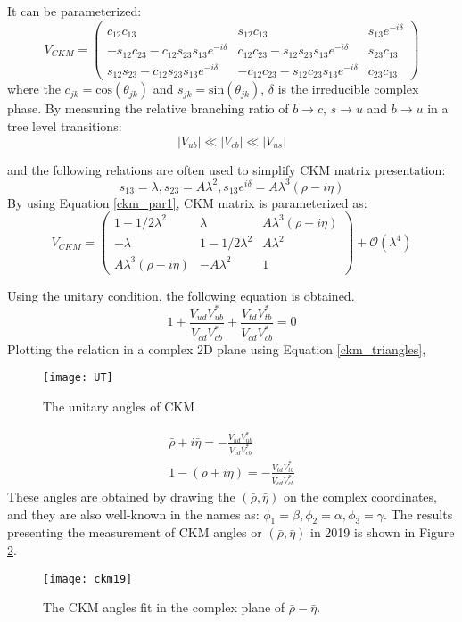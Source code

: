 It can be parameterized:
\begin{equation}
V_{CKM}=
\begin{pmatrix}
c_{12}c_{13} & s_{12}c_{13} & s_{13}e^{-i\delta }\\
-s_{12}c_{23}-c_{12}s_{23}s_{13}e^{-i\delta } &c_{12}c_{23}-s_{12}s_{23}s_{13}e^{-i\delta } & s_{23}c_{13}\\
s_{12}s_{23}-c_{12}s_{23}s_{13}e^{-i\delta }  & -c_{12}c_{23}-s_{12}c_{23}s_{13}e^{-i\delta } & c_{23}c_{13}
\end{pmatrix}
\end{equation}
where the $c_{jk}=\text{cos}(\theta_{jk})$ and $s_{jk}=\text{sin}(\theta_{jk})$, $\delta$ is the irreducible complex phase. By measuring the relative branching ratio of $b\to c$, $s\to u$ and $b\to u$ in a tree level transitions: 
\begin{equation}
|V_{ub}|\ll |V_{cb}|\ll |V_{us}|
\end{equation}

and the following relations are often used to simplify CKM matrix presentation:
\begin{equation}\label{ckm_par1}
s_{13}=\lambda , s_{23}=A\lambda^2, s_{13}e^{i\delta}=A\lambda^3(\rho-i\eta)
\end{equation}
By using Equation \ref{ckm_par1}, CKM matrix is parameterized as:
\begin{equation}
V_{CKM}=
\begin{pmatrix}
1-1/2\lambda^2 & \lambda & A\lambda^3(\rho-i\eta)\\
-\lambda & 1-1/2\lambda^2 & A\lambda^2\\
A\lambda^3(\rho-i\eta) & -A\lambda^2 & 1
\end{pmatrix}+\mathcal{O}(\lambda^4)
\end{equation}

Using the unitary condition, the following equation is obtained.
\begin{equation}\label{ckm_triangles}
1+
\frac{V_{ud}V^*_{ub}}{V_{cd}V^*_{cb}}+
\frac{V_{td}V^*_{tb}}{V_{cd}V^*_{cb}}
=0
\end{equation}
Plotting the relation in a complex 2D plane using Equation \ref{ckm_triangles},
\begin{figure}[htpb]
	\centering
	\texttt{[image: UT]}
	\caption{The unitary angles of CKM}
	\label{fig:ckm_angles}
\end{figure}
\begin{eqnarray}
\bar{\rho}+i\bar{\eta}=- \frac{V_{ud}V^*_{ub}}{V_{cd}V^*_{cb}}\\
1-(\bar{\rho}+i\bar{\eta})=-\frac{V_{td}V^*_{tb}}{V_{cd}V^*_{cb}}
\end{eqnarray}
These angles are obtained by drawing the $(\bar{\rho},\bar{\eta})$ on the complex coordinates, and they are also well-known in the names as: $\phi_1=\beta,\phi_2=\alpha,\phi_3=\gamma$. The results presenting the measurement of CKM angles or $(\bar{\rho},\bar{\eta})$ in 2019 is shown in Figure \ref{fig:ckm19}.
\begin{figure}[htbp]
	\centering
	\texttt{[image: ckm19]}
	\caption{The CKM angles fit in the complex plane of $\bar{\rho}-\bar{\eta}$.\cite{ckmfitter}}
	\label{fig:ckm19}
\end{figure}

